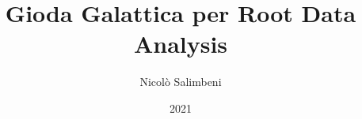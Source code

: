 \documentclass[a4paper,12pt]{book}
\begin{document}
\author{Nicolò Salimbeni}
\title{Gioda Galattica per Root Data Analysis}
\date{2021}

\mainmatter %
\maketitle  %
\tableofcontents  %






\end{document}

